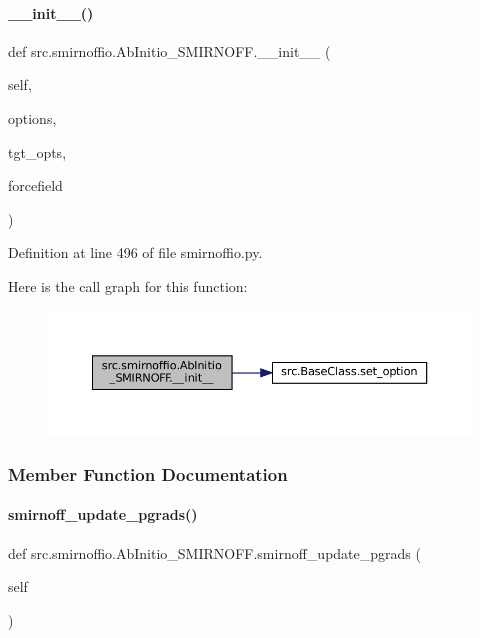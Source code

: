 \paragraph{\texorpdfstring{\+\_\+\+\_\+init\+\_\+\+\_\+()}{\_\_init\_\_()}}
{\footnotesize\ttfamily def src.\+smirnoffio.\+Ab\+Initio\+\_\+\+S\+M\+I\+R\+N\+O\+F\+F.\+\_\+\+\_\+init\+\_\+\+\_\+ (\begin{DoxyParamCaption}\item[{}]{self,  }\item[{}]{options,  }\item[{}]{tgt\+\_\+opts,  }\item[{}]{forcefield }\end{DoxyParamCaption})}



Definition at line 496 of file smirnoffio.\+py.

Here is the call graph for this function\+:
\nopagebreak
\begin{figure}[H]
\begin{center}
\leavevmode
\includegraphics[width=350pt]{classsrc_1_1smirnoffio_1_1AbInitio__SMIRNOFF_ab5c3e12bd1cabe52601d1a5c96085d9d_cgraph}
\end{center}
\end{figure}


\subsubsection{Member Function Documentation}
\mbox{\label{classsrc_1_1smirnoffio_1_1AbInitio__SMIRNOFF_aba6c15a7fd233b8ec236dfa8551d1c93}} 
\paragraph{\texorpdfstring{smirnoff\+\_\+update\+\_\+pgrads()}{smirnoff\_update\_pgrads()}}
{\footnotesize\ttfamily def src.\+smirnoffio.\+Ab\+Initio\+\_\+\+S\+M\+I\+R\+N\+O\+F\+F.\+smirnoff\+\_\+update\+\_\+pgrads (\begin{DoxyParamCaption}\item[{}]{self }\end{DoxyParamCaption})}



